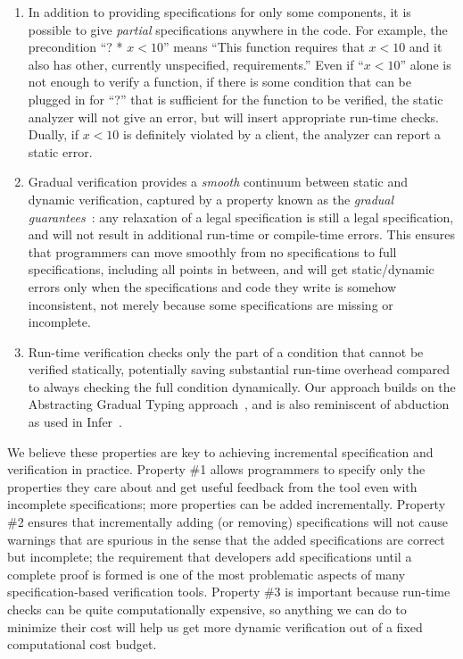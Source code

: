 \documentclass[10pt,twocolumn]{article}
\begin{document}
\begin{sloppypar}
\begin{enumerate}[leftmargin=1em]

\item
In addition to providing specifications for only some components, it is possible to give \textit{partial} specifications anywhere in the code.  For example, the precondition ``? * $x<10$'' means ``This function requires that $x<10$ and it also has other, currently unspecified, requirements.''  Even if ``$x<10$'' alone is not enough to verify a function, if there is some condition that can be plugged in for ``?'' that is sufficient for the function to be verified, the static analyzer will not give an error, but will insert appropriate run-time checks. Dually, if $x<10$ is definitely violated by a client, the analyzer can report a static error.

\item
Gradual verification provides a {\em smooth} continuum between static and dynamic verification, captured by a property known as the \textit{gradual guarantees}~\cite{siekAl:snapl2015}: any relaxation of a legal specification is still a legal specification, and will not result in additional run-time or compile-time errors.  This ensures that programmers can move smoothly from no specifications to full specifications, including all points in between, and will get static/dynamic errors only when the specifications and code they write is somehow inconsistent, not merely because some specifications are missing or incomplete.

\item
Run-time verification checks only the part of a condition that cannot be verified statically, potentially saving substantial run-time overhead compared to always checking the full condition dynamically.  Our approach builds on the Abstracting Gradual Typing approach~\cite{garciaAl:popl2016}, and is also reminiscent of abduction as used in Infer~\cite{Calcagno:2011:CSA:2049697.2049700}.
\end{enumerate}

We believe these properties are key to achieving incremental specification and verification in practice.  Property \#1 allows programmers to specify only the properties they care about and get useful feedback from the tool even with incomplete specifications; more properties can be added incrementally.  Property \#2 ensures that incrementally adding (or removing) specifications will not cause warnings that are spurious in the sense that the added specifications are correct but incomplete; the requirement that developers add specifications until a complete proof is formed is one of the most problematic aspects of many specification-based verification tools.  Property \#3 is important because run-time checks can be quite computationally expensive, so anything we can do to minimize their cost will help us get more dynamic verification out of a fixed computational cost budget.



\end{sloppypar}
\end{document}
